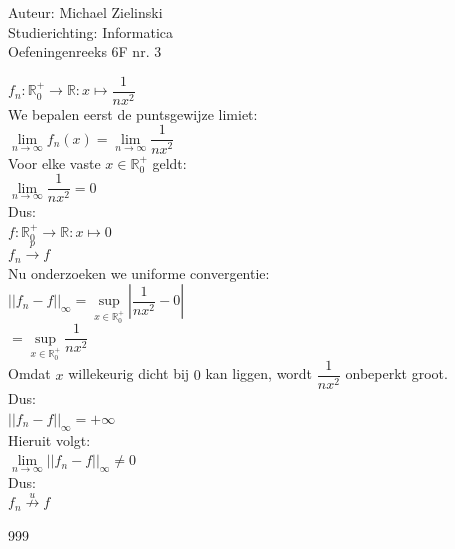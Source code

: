 \documentclass[a4paper]{article}
\begin{document}
  
\noindent \large Auteur: Michael Zielinski \\
\noindent \large Studierichting: Informatica\\
\noindent \large Oefeningenreeks 6F nr. 3\\

\medskip

\normalsize

$ f_n : \mathbb{R}_0^+ \rightarrow \mathbb{R} : x \mapsto \dfrac{1}{nx^2} $ \\

We bepalen eerst de puntsgewijze limiet: \\

$ \lim\limits_{n \rightarrow \infty} f_n(x)
= \lim\limits_{n \rightarrow \infty}\dfrac{1}{nx^2} $ \\

Voor elke vaste $x \in \mathbb{R}_0^+$ geldt: \\

$ \lim\limits_{n \rightarrow \infty}\dfrac{1}{nx^2} = 0 $ \\

Dus: \\

$ f : \mathbb{R}_0^+ \rightarrow \mathbb{R} : x \mapsto 0 $ \\

$ f_n \stackrel{p}{\rightarrow} f $ \\

Nu onderzoeken we uniforme convergentie: \\

$ \left|\left|f_n-f\right|\right|_{\infty}
= \sup\limits_{x \in \mathbb{R}_0^+}\left|\dfrac{1}{nx^2}-0\right| $ \\

$ = \sup\limits_{x \in \mathbb{R}_0^+}\dfrac{1}{nx^2} $ \\

Omdat $x$ willekeurig dicht bij $0$ kan liggen, wordt $\dfrac{1}{nx^2}$ onbeperkt groot. \\

Dus: \\

$ \left|\left|f_n-f\right|\right|_{\infty}=+\infty $ \\

Hieruit volgt: \\

$ \lim\limits_{n \rightarrow \infty}\left|\left|f_n-f\right|\right|_{\infty}\neq 0 $ \\

Dus: \\

$ f_n \stackrel{u}{\not\rightarrow} f $ \\

\begin{thebibliography}{999}
\end{thebibliography}
\end{document}
